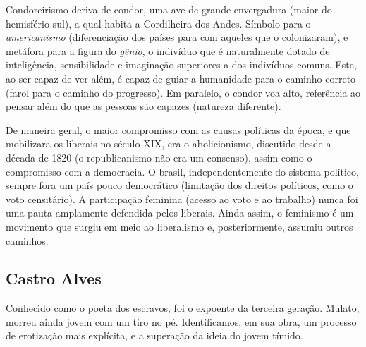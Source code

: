 Condoreirismo deriva de condor, uma ave de grande envergadura (maior do hemisfério sul), a qual habita a Cordilheira dos Andes. Símbolo para o \textit{americanismo} (diferenciação dos países para com aqueles que o colonizaram), e metáfora para a figura do \textit{gênio}, o indivíduo que é naturalmente dotado de inteligência, sensibilidade e imaginação superiores a dos indivíduos comuns. Este, ao ser capaz de ver além, é capaz de guiar a humanidade para o caminho correto (farol para o caminho do progresso). Em paralelo, o condor voa alto, referência ao pensar além do que as pessoas são capazes (natureza diferente).

De maneira geral, o maior compromisso com as causas políticas da época, e que mobilizara os liberais no século XIX, era o abolicionismo, discutido desde a década de 1820 (o republicanismo não era um consenso), assim como o compromisso com a democracia. O brasil, independentemente do sistema político, sempre fora um país pouco democrático (limitação dos direitos políticos, como o voto censitário). A participação feminina (acesso ao voto e ao trabalho) nunca foi uma pauta amplamente defendida pelos liberais. Ainda assim, o feminismo é um movimento que surgiu em meio ao liberalismo e, posteriormente, assumiu outros caminhos.

\subsection{Castro Alves}

Conhecido como o poeta dos escravos, foi o expoente da terceira geração. Mulato, morreu ainda jovem com um tiro no pé. Identificamos, em sua obra, um processo de erotização mais explícita, e a superação da ideia do jovem tímido.

